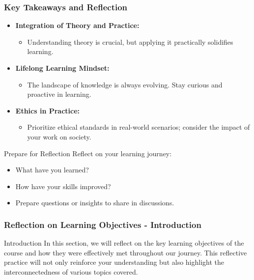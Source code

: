\documentclass[aspectratio=169]{beamer}
\begin{document}
\begin{frame}[fragile]
    \frametitle{Key Takeaways and Reflection}
    \begin{itemize}
        \item \textbf{Integration of Theory and Practice:}
        \begin{itemize}
            \item Understanding theory is crucial, but applying it practically solidifies learning.
        \end{itemize}

        \item \textbf{Lifelong Learning Mindset:}
        \begin{itemize}
            \item The landscape of knowledge is always evolving. Stay curious and proactive in learning.
        \end{itemize}

        \item \textbf{Ethics in Practice:}
        \begin{itemize}
            \item Prioritize ethical standards in real-world scenarios; consider the impact of your work on society.
        \end{itemize}
    \end{itemize}

    \begin{block}{Prepare for Reflection}
        Reflect on your learning journey: 
        \begin{itemize}
            \item What have you learned? 
            \item How have your skills improved?
            \item Prepare questions or insights to share in discussions.
        \end{itemize}
    \end{block}
\end{frame}

\begin{frame}[fragile]
    \frametitle{Reflection on Learning Objectives - Introduction}
    \begin{block}{Introduction}
        In this section, we will reflect on the key learning objectives of the course and how they were effectively met throughout our journey. 
        This reflective practice will not only reinforce your understanding but also highlight the interconnectedness of various topics covered.
    \end{block}
\end{frame}
\end{document}
